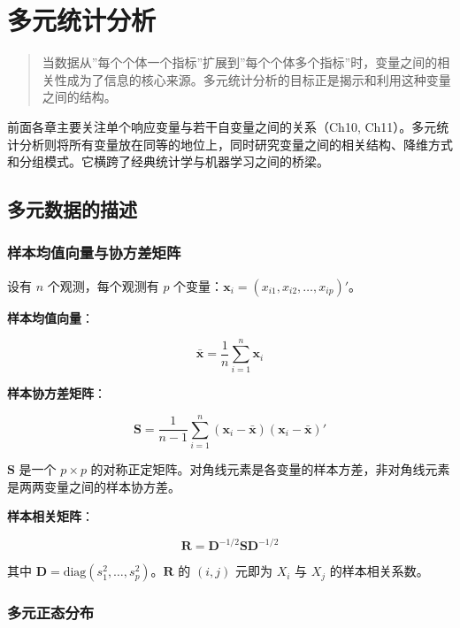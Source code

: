 \documentclass[
]{book}
\begin{document}
\chapter{多元统计分析}\label{ux591aux5143ux7edfux8ba1ux5206ux6790}

\begin{quote}
当数据从''每个个体一个指标''扩展到''每个个体多个指标''时，变量之间的相关性成为了信息的核心来源。多元统计分析的目标正是揭示和利用这种变量之间的结构。
\end{quote}

前面各章主要关注单个响应变量与若干自变量之间的关系（Ch10, Ch11）。多元统计分析则将所有变量放在同等的地位上，同时研究变量之间的相关结构、降维方式和分组模式。它横跨了经典统计学与机器学习之间的桥梁。

\section{多元数据的描述}\label{ux591aux5143ux6570ux636eux7684ux63cfux8ff0}

\subsection{样本均值向量与协方差矩阵}\label{ux6837ux672cux5747ux503cux5411ux91cfux4e0eux534fux65b9ux5deeux77e9ux9635}

设有 \(n\) 个观测，每个观测有 \(p\) 个变量：\(\mathbf{x}_i = (x_{i1}, x_{i2}, \ldots, x_{ip})'\)。

\textbf{样本均值向量}：

\[\bar{\mathbf{x}} = \frac{1}{n} \sum_{i=1}^n \mathbf{x}_i\]

\textbf{样本协方差矩阵}：

\[\mathbf{S} = \frac{1}{n-1} \sum_{i=1}^n (\mathbf{x}_i - \bar{\mathbf{x}})(\mathbf{x}_i - \bar{\mathbf{x}})'\]

\(\mathbf{S}\) 是一个 \(p \times p\) 的对称正定矩阵。对角线元素是各变量的样本方差，非对角线元素是两两变量之间的样本协方差。

\textbf{样本相关矩阵}：

\[\mathbf{R} = \mathbf{D}^{-1/2} \mathbf{S} \mathbf{D}^{-1/2}\]

其中 \(\mathbf{D} = \text{diag}(s_1^2, \ldots, s_p^2)\)。\(\mathbf{R}\) 的 \((i, j)\) 元即为 \(X_i\) 与 \(X_j\) 的样本相关系数。

\subsection{多元正态分布}\label{ux591aux5143ux6b63ux6001ux5206ux5e03}
\end{document}
